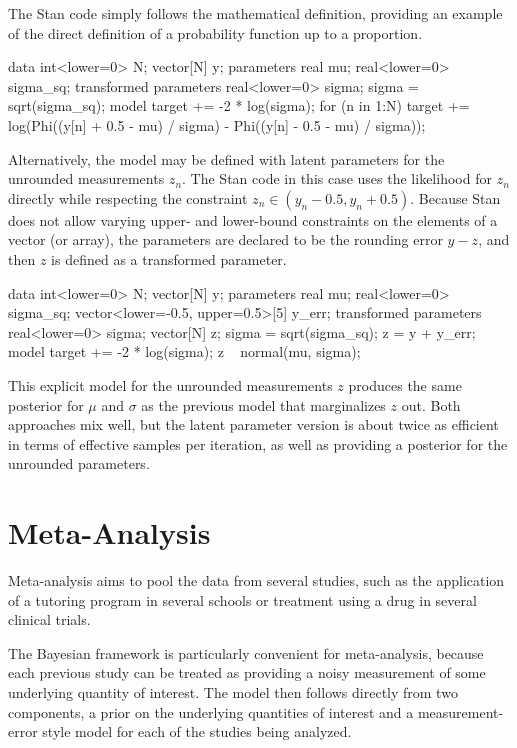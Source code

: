 The Stan code simply follows the mathematical definition, providing an
example of the direct definition of a probability function up to a
proportion.
%
\begin{stancode}
data {
  int<lower=0> N;
  vector[N] y;
}
parameters {
  real mu;
  real<lower=0> sigma_sq;
}
transformed parameters {
  real<lower=0> sigma;
  sigma = sqrt(sigma_sq);
}
model {
  target += -2 * log(sigma);
  for (n in 1:N)
    target += log(Phi((y[n] + 0.5 - mu) / sigma)
                  - Phi((y[n] - 0.5 - mu) / sigma));
}
\end{stancode}

Alternatively, the model may be defined with latent parameters for the
unrounded measurements $z_n$.  The Stan code in this case uses the
likelihood for $z_n$ directly while respecting the constraint $z_n \in
(y_n - 0.5, y_n + 0.5)$.  Because Stan does not allow varying upper-
and lower-bound constraints on the elements of a vector (or array),
the parameters are declared to be the rounding error $y - z$, and
then $z$ is defined as a transformed parameter.
%
\begin{stancode}
data {
  int<lower=0> N;
  vector[N] y;
}
parameters {
  real mu;
  real<lower=0> sigma_sq;
  vector<lower=-0.5, upper=0.5>[5] y_err;
}
transformed parameters {
  real<lower=0> sigma;
  vector[N] z;
  sigma = sqrt(sigma_sq);
  z = y + y_err;
}
model {
  target += -2 * log(sigma);
  z ~ normal(mu, sigma);
}
\end{stancode}
%
This explicit model for the unrounded measurements $z$ produces the
same posterior for $\mu$ and $\sigma$ as the previous model that
marginalizes $z$ out.  Both approaches mix well, but the latent
parameter version is about twice as efficient in terms of effective
samples per iteration, as well as providing a posterior for the
unrounded parameters.


\section{Meta-Analysis}

Meta-analysis aims to pool the data from several studies, such as the
application of a tutoring program in several schools or treatment
using a drug in several clinical trials.  

The Bayesian framework is particularly convenient for meta-analysis,
because each previous study can be treated as providing a noisy
measurement of some underlying quantity of interest.  The model then
follows directly from two components, a prior on the underlying
quantities of interest and a measurement-error style model for each of
the studies being analyzed.

